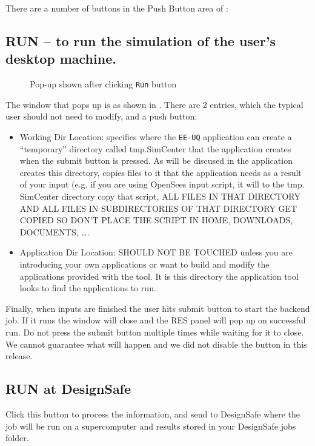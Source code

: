 There are a number of buttons in the Push Button area of :

\subsection{RUN – to run the simulation of the user’s desktop machine.}
\begin{figure}[!htbp]
  \caption{Pop-up shown after clicking \texttt{Run} button}
  \label{fig:figure15}
\end{figure}

The window that pops up is as shown in . There
are 2 entries, which the typical user should not need to modify, and a push button:

\begin{itemize}
\item Working Dir Location: specifies where the \texttt{EE-UQ} application can 
create a “temporary” directory called tmp.SimCenter that the application 
creates when the submit button is pressed. As will be discused in  
the application creates this directory, copies files to it that the application needs as a
result of your input (e.g. if you are using OpenSees input script, it
will to the tmp. SimCenter directory copy that script, ALL FILES IN
THAT DIRECTORY AND ALL FILES IN SUBDIRECTORIES OF THAT DIRECTORY GET
COPIED SO DON’T PLACE THE SCRIPT IN HOME, DOWNLOADS, DOCUMENTS, ….
\item Application Dir Location: SHOULD NOT BE TOUCHED unless you are introducing your own applications or want to build and modify the 
applications provided with the tool. It is this directory the
application tool looks to find the applications to run.
\end{itemize}


Finally, when inputs are finished the user hits submit button to start
the backend job. If it runs the window will close and the RES panel
will pop up on successful run. Do not press the submit button multiple
times while waiting for it to close. We cannot guarantee what will
happen and we did not disable the button in this release.

\subsection{RUN at DesignSafe}
Click this button to process the information, and send to DesignSafe
where the job will be run on a supercomputer and results stored in
your DesignSafe jobs folder.


